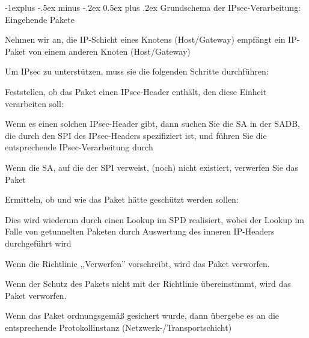 \documentclass[a4paper]{article}
\makeatletter
\renewcommand{\subsection}{\@startsection{subsection}{2}{0mm}%
 {-1explus -.5ex minus -.2ex}%
 {0.5ex plus .2ex}%
 {\normalfont\normalsize\bfseries}}
\makeatother
\begin{document}
\begin{multicols}{3}
      \subsection{Grundschema der IPsec-Verarbeitung: Eingehende Pakete}
      \begin{itemize*}
            \item Nehmen wir an, die IP-Schicht eines Knotens (Host/Gateway) empfängt ein IP-Paket von einem anderen Knoten (Host/Gateway)
            \item Um IPsec zu unterstützen, muss sie die folgenden Schritte durchführen:
            \begin{itemize*}
                  \item Feststellen, ob das Paket einen IPsec-Header enthält, den diese Einheit verarbeiten soll:
                  \begin{itemize*}
                        \item Wenn es einen solchen IPsec-Header gibt, dann suchen Sie die SA in der SADB, die durch den SPI des IPsec-Headers spezifiziert ist, und führen Sie die entsprechende IPsec-Verarbeitung durch
                        \item Wenn die SA, auf die der SPI verweist, (noch) nicht existiert, verwerfen Sie das Paket
                  \end{itemize*}
                  \item Ermitteln, ob und wie das Paket hätte geschützt werden sollen:
                  \begin{itemize*}
                        \item Dies wird wiederum durch einen Lookup im SPD realisiert, wobei der Lookup im Falle von getunnelten Paketen durch Auswertung des inneren IP-Headers durchgeführt wird
                        \item Wenn die Richtlinie ,,Verwerfen'' vorschreibt, wird das Paket verworfen.
                        \item Wenn der Schutz des Pakets nicht mit der Richtlinie übereinstimmt, wird das Paket verworfen.
                        \item Wenn das Paket ordnungsgemäß gesichert wurde, dann übergebe es an die entsprechende Protokollinstanz (Netzwerk-/Transportschicht)
                  \end{itemize*}
            \end{itemize*}
      \end{itemize*}


\end{multicols}
\end{document}
